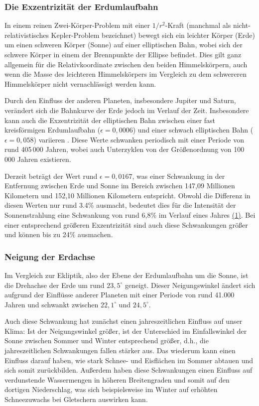 \subsubsection{Die Exzentrizit\"at der Erdumlaufbahn} 

In einem reinen Zwei-K\"orper-Problem mit einer $1/r^2$-Kraft
(manchmal als nicht-relativistisches Kepler-Problem bezeichnet) bewegt sich ein leichter K\"orper (Erde)
um einen schweren K\"orper (Sonne) auf einer elliptischen Bahn, wobei sich der schwere K\"orper
in einem der Brennpunkte der Ellipse befindet. Dies gilt ganz allgemein f\"ur die Relativkoordinate
zwischen den beiden Himmelsk\"orpern, auch wenn die Masse des leichteren Himmelsk\"orpers
im Vergleich zu dem schwereren Himmelsk\"orper nicht vernachl\"assigt werden kann.  

Durch den Einfluss der anderen Planeten, insbesondere Jupiter und Saturn, ver\"andert sich die 
Bahnkurve der Erde jedoch im Verlauf der Zeit. Insbesondere kann auch die Exzentrizit\"at der
elliptischen Bahn zwischen einer fast kreisf\"ormigen Erdumlaufbahn ($\epsilon = 0,0006$) und einer
schwach elliptischen Bahn ($\epsilon =0,058 $) variieren \cite{Wikipedia_Milankovic}. 
Diese Werte schwanken periodisch mit einer Periode von rund
405\,000 Jahren, wobei auch Unterzyklen von der Gr\"o\ss enordnung von 100\,000 Jahren existieren. 

Derzeit betr\"agt der Wert rund $\epsilon= 0,0167$, was einer Schwankung in der Entfernung zwischen
Erde und Sonne im Bereich zwischen
147,09 Millionen Kilometern und 152,10 Millionen Kilometern entspricht. Obwohl die Differenz in diesen
Werten nur rund 3.4\% ausmacht, bedeutet dies f\"ur die Intensit\"at der Sonnenstrahlung
eine Schwankung von rund 6,8\% im Verlauf eines Jahres \hyperref[Anm-1]{(1)}. 
Bei einer entsprechend gr\"o\ss eren Exzentrizit\"at sind auch diese 
Schwankungen gr\"o\ss er und k\"onnen bis zu 24\% ausmachen.

\subsubsection{Neigung der Erdachse} 

Im Vergleich zur Ekliptik, also der Ebene der Erdumlaufbahn
um die Sonne, ist die Drehachse der Erde um rund $23,5^\circ$ geneigt. Dieser Neigungswinkel
\"andert sich aufgrund der Einfl\"usse anderer Planeten mit einer Periode von rund 41.000 Jahren
und schwankt zwischen $22,1^\circ$ und $24,5^\circ$.

Auch diese Schwankung hat zun\"achst einen jahreszeitlichen Einfluss auf unser Klima: Ist der
Neigungswinkel gr\"o\ss er, ist der Unterschied im Einfallswinkel der Sonne zwischen Sommer und
Winter entsprechend gr\"o\ss er, d.h., die jahreszeitlichen Schwankungen fallen st\"arker aus. 
Das wiederum kann einen Einfluss darauf haben, wie stark Schnee- und Eisfl\"achen im Sommer
abtauen und sich somit zur\"uckbilden. Au\ss erdem haben diese Schwankungen einen Einfluss
auf verdunstende Wassermengen in h\"oheren Breitengraden und somit auf den dortigen Niederschlag, 
was sich beispielsweise im Winter auf erh\"ohten Schneezuwachs bei Gletschern auswirken kann. 

